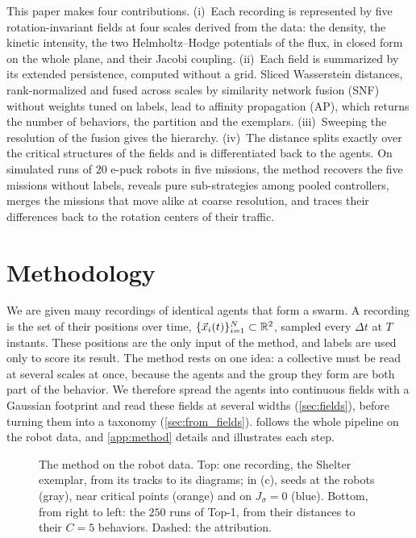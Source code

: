 \documentclass[pdflatex,sn-apa]{sn-jnl}
\begin{document}
This paper makes four contributions. (i)~Each recording is represented by five
rotation-invariant fields at four scales derived from the data: the density, the kinetic intensity, the two
Helmholtz--Hodge potentials of the flux, in closed form on the whole plane, and their Jacobi coupling. (ii)~Each field
is summarized by its extended persistence, computed without a grid. Sliced Wasserstein distances, rank-normalized and
fused across scales by similarity network fusion (SNF) without weights tuned on labels, lead to affinity propagation
(AP), which returns the number of behaviors, the partition and the exemplars. (iii)~Sweeping the resolution of the
fusion gives the hierarchy. (iv)~The distance splits exactly over the critical structures of the fields and is
differentiated back to the agents. On  simulated runs of $20$ e-puck robots in five missions, the method
recovers the five missions without labels, reveals pure sub-strategies among pooled controllers, merges the missions
that move alike at coarse resolution, and traces their differences back to the rotation centers of their traffic.



\FloatBarrier
\section{Methodology}
\label{sec:method}

We are given many recordings of identical agents that form a swarm. A recording is the set of their positions over time,
$\{\vec{x}_i(t)\}_{i=1}^N\subset\mathbb{R}^2$, sampled every $\Delta t$ at $T$ instants. These positions are the only input of the
method, and labels are used only to score its result. The method rests on one idea: a collective must be read at
several scales at once, because the agents and the group they form are both part of the behavior. We therefore spread
the agents into continuous fields with a Gaussian footprint and read these fields at several widths
(\cref{sec:fields}), before turning them into a taxonomy (\cref{sec:from_fields}).  follows the whole
pipeline on the robot data, and \cref{app:method} details and illustrates each step.

\begin{figure}[!htbp]
\centering
{}
\caption{The method on the robot data. Top: one recording, the Shelter exemplar, from its tracks to its diagrams;
in (c), seeds at the robots (gray), near critical points (orange) and on $J_\sigma=0$ (blue). Bottom, from right to
left: the $250$ runs of Top-1, from their distances to their $C=5$ behaviors. Dashed: the attribution.}
\label{fig:overview}
\end{figure}
\end{document}
